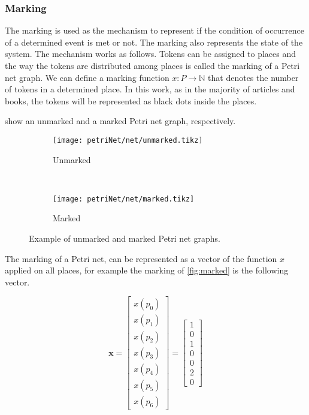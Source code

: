\subsubsection{Marking}
\label{sec:marking}

The marking is used as the mechanism to
represent if the condition of occurrence of a determined event is met or not.
The marking also represents the state of the system. The mechanism
works as follows. Tokens can be assigned to places and the way the tokens are
distributed among places is called the marking of a Petri net graph. We can define a marking function $x :
P \rightarrow \mathbb{N}$ that denotes the number of tokens in a determined place.
In this
work, as in the majority of articles and books, the tokens will be
represented as black dots inside the places. 

 show an unmarked and a marked Petri net graph, respectively.
\begin{figure}[H]
\begin{subfigure}[t]{0.45\textwidth}
  \centering
  \texttt{[image: petriNet/net/unmarked.tikz]}
  \caption{Unmarked}
  \label{fig:unmarked}
\end{subfigure}
~
\begin{subfigure}[t]{0.45\textwidth}
  \centering
  \texttt{[image: petriNet/net/marked.tikz]}
  \caption{Marked}
  \label{fig:marked}
\end{subfigure}
\caption{Example of unmarked and marked Petri net graphs.}
\end{figure}

The marking of a Petri net, can be represented as a
vector of the function $x$ applied on all places, for example the marking of 
\autoref{fig:marked} is the following vector.

\begin{equation*}
\mathbf{x}=\begin{bmatrix}
  x(p_0)\\
  x(p_1)\\
  x(p_2)\\
  x(p_3)\\
  x(p_4)\\
  x(p_5)\\
  x(p_6)
\end{bmatrix} =
\begin{bmatrix}
  1\\
  0\\
  1\\
  0\\
  0\\
  2\\
  0
\end{bmatrix}
\end{equation*}

